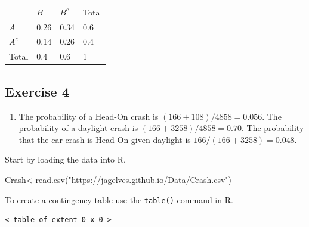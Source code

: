 \documentclass[
  letterpaper,
  DIV=11,
  numbers=noendperiod]{scrreprt}
\newenvironment{Shaded}{\begin{snugshade}}{\end{snugshade}}
\newcommand{\AttributeTok}[1]{\textcolor[rgb]{0.40,0.45,0.13}{#1}}
\newcommand{\FunctionTok}[1]{\textcolor[rgb]{0.28,0.35,0.67}{#1}}
\newcommand{\NormalTok}[1]{\textcolor[rgb]{0.00,0.23,0.31}{#1}}
\newcommand{\OtherTok}[1]{\textcolor[rgb]{0.00,0.23,0.31}{#1}}
\newcommand{\SpecialCharTok}[1]{\textcolor[rgb]{0.37,0.37,0.37}{#1}}
\newcommand{\StringTok}[1]{\textcolor[rgb]{0.13,0.47,0.30}{#1}}
\providecommand{\tightlist}{%
  \setlength{\itemsep}{0pt}\setlength{\parskip}{0pt}}\usepackage{longtable,booktabs,array}
\begin{document}
\begin{longtable}[]{@{}llll@{}}
\toprule()
\endhead
& \(B\) & \(B^c\) & Total \\
\(A\) & 0.26 & 0.34 & 0.6 \\
\(A^c\) & 0.14 & 0.26 & 0.4 \\
Total & 0.4 & 0.6 & 1 \\
\bottomrule()
\end{longtable}

\hypertarget{exercise-4-7}{%
\subsection*{Exercise 4}\label{exercise-4-7}}

\begin{enumerate}
\def\labelenumi{\arabic{enumi}.}
\tightlist
\item
  The probability of a Head-On crash is \((166+108)/4858=0.056\). The
  probability of a daylight crash is \((166+3258)/4858=0.70\). The
  probability that the car crash is Head-On given daylight is
  \(166/(166+3258)=0.048\).
\end{enumerate}

Start by loading the data into R.

\begin{Shaded}
\begin{Highlighting}[numbers=left,,]
\NormalTok{Crash}\OtherTok{\textless{}{-}}\FunctionTok{read.csv}\NormalTok{(}\StringTok{"https://jagelves.github.io/Data/Crash.csv"}\NormalTok{)}
\end{Highlighting}
\end{Shaded}

To create a contingency table use the \texttt{table()} command in R.

\begin{Shaded}
\end{Shaded}

\begin{verbatim}
< table of extent 0 x 0 >
\end{verbatim}
\end{document}
